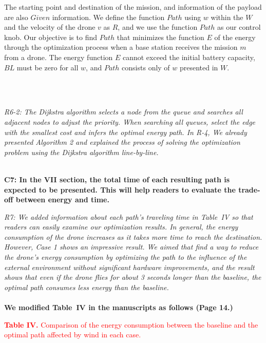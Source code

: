 \documentclass[onecolumn]{IEEEconf}
\begin{document}
\begin{description}
\begin{mdframed}[ linewidth=.75pt, userdefinedwidth=0.9\textwidth]
{    The starting point and destination of the mission, and information of the payload are also $Given$ information.
    We define the function $Path$ using $w$ within the $W$ and the velocity of the drone $v$ as $R$, and we use the function $Path$ as our control knob.
    Our objective is to find $Path$ that minimizes the function $E$ of the energy through the optimization process when a base station receives the mission $m$ from a drone.
    The energy function $E$ cannot exceed the initial battery capacity, $BL$ must be zero for all $w$, and $Path$ consists only of $w$ presented in $W$.}
    \end{mdframed} 
    ~\\
    ~\\
	\item \textit
    {
	R6-2:  
    The Dijkstra algorithm selects a node from the queue and searches all adjacent nodes to adjust the priority. When searching all queues, select the edge with the smallest cost and infers the optimal energy path.
    In R-4, We already presented Algorithm 2 and explained the process of solving the optimization problem using the Dijkstra algorithm line-by-line.
	}
	~\\
	~\\
    \item \textbf
    {
	C7: In the VII section, the total time of each resulting path is expected to be presented.  This will help readers to evaluate the trade-off between energy and time.
	}
	\item \textit
	{
	R7: We added information about each path's traveling time in Table~IV so that readers can easily examine our optimization results.  
    In general, the energy consumption of the drone increases as it takes more time to reach the destination. However, Case 1 shows an impressive result. 
    We aimed that find a way to reduce the drone's energy consumption by optimizing the path to the influence of the external environment without significant hardware improvements, and the result shows that even if the drone flies for about 3 seconds longer than the baseline, the optimal path consumes less energy than the baseline.  
	}
    ~\\
	~\\
	\textbf{We modified Table~IV in the manuscripts as follows (Page 14.)}\\
    \begin{mdframed}[ linewidth=.75pt, userdefinedwidth=0.9\textwidth]
     \textcolor{red}{\textbf{Table IV.} Comparison of the energy consumption between the baseline and the optimal path affected by wind in each case.}  

\end{mdframed}
\end{description}
\end{document}
